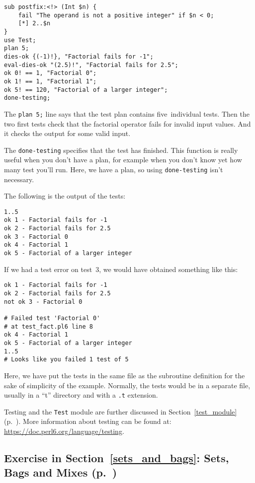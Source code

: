 \begin{verbatim}
sub postfix:<!> (Int $n) {
    fail "The operand is not a positive integer" if $n < 0;
    [*] 2..$n
}
use Test;
plan 5;
dies-ok {(-1)!}, "Factorial fails for -1";
eval-dies-ok "(2.5)!", "Factorial fails for 2.5";
ok 0! == 1, "Factorial 0";
ok 1! == 1, "Factorial 1";
ok 5! == 120, "Factorial of a larger integer";
done-testing;
\end{verbatim}

The {\tt plan 5;} line says that the test plan contains 
five~individual tests. Then the two first tests check that 
the factorial operator fails for invalid input values. And 
it checks the output for some valid input.

The {\tt done-testing} specifies that the test has finished. 
This function is really useful when you don't have a plan, 
for example when you don't know yet how many test you'll run. 
Here, we have a plan, so using {\tt done-testing} isn't necessary.

The following is the output of the tests:

\begin{verbatim}
1..5
ok 1 - Factorial fails for -1
ok 2 - Factorial fails for 2.5
ok 3 - Factorial 0
ok 4 - Factorial 1
ok 5 - Factorial of a larger integer
\end{verbatim}

If we had a test error on test~3, we would have obtained 
something like this:

\begin{verbatim}
ok 1 - Factorial fails for -1
ok 2 - Factorial fails for 2.5
not ok 3 - Factorial 0

# Failed test 'Factorial 0'
# at test_fact.pl6 line 8
ok 4 - Factorial 1
ok 5 - Factorial of a larger integer
1..5
# Looks like you failed 1 test of 5
\end{verbatim}

Here, we have put the tests in the same file as the subroutine 
definition for the sake of simplicity of the example. Normally, 
the tests would be in a separate file, usually in a ``t'' 
directory and with a \verb'.t' extension.

Testing and the {\tt Test} module are further discussed  
in Section~\ref{test_module} (p.~\pageref{test_module}).
More information about testing can be found at: 
\url{https://doc.perl6.org/language/testing}.

\subsection{Exercise in Section~\ref{sets_and_bags}: Sets, Bags and Mixes (p.~\pageref{diff_with_set})}
\label{sol_diff_with_set}


